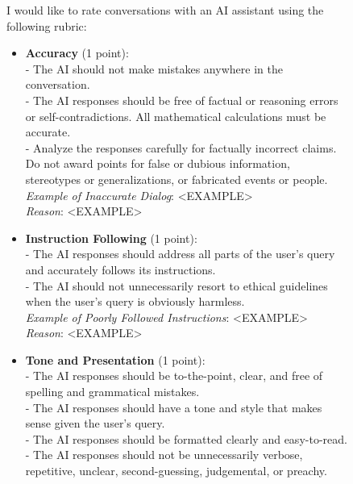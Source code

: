













\begin{figure}
  

\begin{framed}

I would like to rate conversations with an AI assistant using the following rubric: \\

\begin{itemize}
\item \textbf{Accuracy} (1 point): \\
    - The AI should not make mistakes anywhere in the conversation.\\
    - The AI responses should be free of factual or reasoning errors or self-contradictions. All mathematical calculations must be accurate.\\
    - Analyze the responses carefully for factually incorrect claims. Do not award points for false or dubious information, stereotypes or generalizations, or fabricated events or people. \\

    \emph{Example of Inaccurate Dialog}: <EXAMPLE> \\
    \emph{Reason}: <EXAMPLE> \\

\item \textbf{Instruction Following} (1 point): \\
    - The AI responses should address all parts of the user's query and accurately follows its instructions. \\
    - The AI should not unnecessarily resort to ethical guidelines when the user's query is obviously harmless. \\

    \emph{Example of Poorly Followed Instructions}: <EXAMPLE> \\
    \emph{Reason}: <EXAMPLE> \\

\item \textbf{Tone and Presentation} (1 point): \\
    - The AI responses should be to-the-point, clear, and free of spelling and grammatical mistakes. \\
    - The AI responses should have a tone and style that makes sense given the user's query.\\
    - The AI responses should be formatted clearly and easy-to-read.\\
    - The AI responses should not be unnecessarily verbose, repetitive, unclear, second-guessing, judgemental, or preachy.\\


\end{itemize}
\end{framed}
\end{figure}
